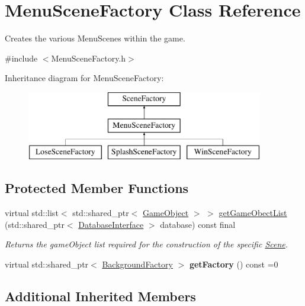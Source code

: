 \hypertarget{class_menu_scene_factory}{}\section{Menu\+Scene\+Factory Class Reference}
\label{class_menu_scene_factory}


Creates the various Menu\+Scenes within the game.  




{\ttfamily \#include $<$Menu\+Scene\+Factory.\+h$>$}

Inheritance diagram for Menu\+Scene\+Factory\+:\begin{figure}[H]
\begin{center}
\leavevmode
\includegraphics[height=3.000000cm]{da/d10/class_menu_scene_factory}
\end{center}
\end{figure}
\subsection*{Protected Member Functions}
\begin{DoxyCompactItemize}
\item 
virtual std\+::list$<$ std\+::shared\+\_\+ptr$<$ \hyperlink{class_game_object}{Game\+Object} $>$ $>$ \hyperlink{class_menu_scene_factory_ade1881c377fa61d1d8fa11c1d30f4ddd}{get\+Game\+Obect\+List} (std\+::shared\+\_\+ptr$<$ \hyperlink{class_database_interface}{Database\+Interface} $>$ database) const final
\begin{DoxyCompactList}\small\item\em Returns the game\+Object list required for the construction of the specific \hyperlink{class_scene}{Scene}. \end{DoxyCompactList}\item 
\mbox{\label{class_menu_scene_factory_ad0f60a16fdbb10c6d7ba3311dafa2e76}} 
virtual std\+::shared\+\_\+ptr$<$ \hyperlink{class_background_factory}{Background\+Factory} $>$ {\bfseries get\+Factory} () const =0
\end{DoxyCompactItemize}
\subsection*{Additional Inherited Members}


